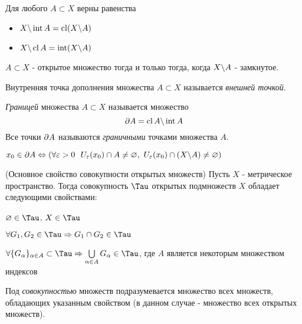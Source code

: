 \begin{multicols}{2}
    \begin{lemma}{}{}
        Для любого $A \subset X$ верны равенства
        \begin{itemize}
            \item $X \backslash \operatorname{int} A = \operatorname{cl}(X \backslash A)$
            
            \item $X \backslash \operatorname{cl} A = \operatorname{int}(X \backslash A)$
        \end{itemize}
    \end{lemma}
    

    \cons $A \subset X$ - открытое множество тогда и только тогда, когда $X \backslash A$ - замкнутое.

    \begin{definition}{}{}
        Внутренняя точка дополнения множества $A \subset X$ называется \textit{внешней точкой}.
    \end{definition}
    \begin{definition}{}{}
        \textit{Границей} множества $A \subset X$ называется множество
        \[
            \partial A = \operatorname{cl} A \backslash \operatorname{int} A
        \]
        Все точки $\partial A$ называются \textit{граничными} точками множества $A$.
    \end{definition}
    \begin{lemma}{}{}
        $x_0 \in \partial A \Leftrightarrow \left(\forall \varepsilon > 0\ \ U_\varepsilon(x_0) \cap A \neq \varnothing,\ U_\varepsilon(x_0) \cap (X \backslash A) \neq \varnothing\right)$
    \end{lemma}
    \begin{theorema}{(Основное свойство совокупности открытых множеств)}{}
        Пусть $X$ - метрическое пространство. Тогда совокупность $\Tau$ открытых подмножеств $X$ обладает следующими свойствами:
        \begin{enumerate*}
            \item $\emptyset \in \Tau$, $X \in \Tau$
            
            \item $\forall G_1, G_2 \in \Tau \Rightarrow G_1 \cap G_2 \in \Tau$
            
            \item $\forall \{G_\alpha\}_{\alpha \in A} \subset \Tau \Rightarrow \bigcup\limits_{\alpha \in A} G_\alpha \in \Tau$, где $A$ является некоторым множеством индексов
        \end{enumerate*}
    \end{theorema}
    
    \begin{note}{}{}
        Под \textit{совокупностью} множеств подразумевается множество всех множеств, обладающих указанным свойством (в данном случае - множество всех открытых множеств).
    \end{note}
    


\end{multicols}
